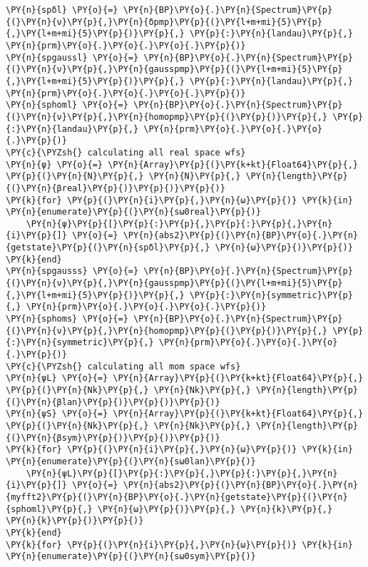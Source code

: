 \begin{Verbatim}[commandchars=\\\{\}]
\PY{n}{spδl} \PY{o}{=} \PY{n}{BP}\PY{o}{.}\PY{n}{Spectrum}\PY{p}{(}\PY{n}{ν}\PY{p}{,}\PY{n}{δpmp}\PY{p}{(}\PY{l+m+mi}{5}\PY{p}{,}\PY{l+m+mi}{5}\PY{p}{)}\PY{p}{,} \PY{p}{:}\PY{n}{landau}\PY{p}{,} \PY{n}{prm}\PY{o}{.}\PY{o}{.}\PY{o}{.}\PY{p}{)}
\PY{n}{spgaussl} \PY{o}{=} \PY{n}{BP}\PY{o}{.}\PY{n}{Spectrum}\PY{p}{(}\PY{n}{ν}\PY{p}{,}\PY{n}{gausspmp}\PY{p}{(}\PY{l+m+mi}{5}\PY{p}{,}\PY{l+m+mi}{5}\PY{p}{)}\PY{p}{,} \PY{p}{:}\PY{n}{landau}\PY{p}{,} \PY{n}{prm}\PY{o}{.}\PY{o}{.}\PY{o}{.}\PY{p}{)}
\PY{n}{sphoml} \PY{o}{=} \PY{n}{BP}\PY{o}{.}\PY{n}{Spectrum}\PY{p}{(}\PY{n}{ν}\PY{p}{,}\PY{n}{homopmp}\PY{p}{(}\PY{p}{)}\PY{p}{,} \PY{p}{:}\PY{n}{landau}\PY{p}{,} \PY{n}{prm}\PY{o}{.}\PY{o}{.}\PY{o}{.}\PY{p}{)}
\PY{c}{\PYZsh{} calculating all real space wfs}
\PY{n}{ψ} \PY{o}{=} \PY{n}{Array}\PY{p}{(}\PY{k+kt}{Float64}\PY{p}{,} \PY{p}{(}\PY{n}{N}\PY{p}{,} \PY{n}{N}\PY{p}{,} \PY{n}{length}\PY{p}{(}\PY{n}{βreal}\PY{p}{)}\PY{p}{)}\PY{p}{)}
\PY{k}{for} \PY{p}{(}\PY{n}{i}\PY{p}{,}\PY{n}{ω}\PY{p}{)} \PY{k}{in} \PY{n}{enumerate}\PY{p}{(}\PY{n}{sω0real}\PY{p}{)}
    \PY{n}{ψ}\PY{p}{[}\PY{p}{:}\PY{p}{,}\PY{p}{:}\PY{p}{,}\PY{n}{i}\PY{p}{]} \PY{o}{=} \PY{n}{abs2}\PY{p}{(}\PY{n}{BP}\PY{o}{.}\PY{n}{getstate}\PY{p}{(}\PY{n}{spδl}\PY{p}{,} \PY{n}{ω}\PY{p}{)}\PY{p}{)}
\PY{k}{end}
\PY{n}{spgausss} \PY{o}{=} \PY{n}{BP}\PY{o}{.}\PY{n}{Spectrum}\PY{p}{(}\PY{n}{ν}\PY{p}{,}\PY{n}{gausspmp}\PY{p}{(}\PY{l+m+mi}{5}\PY{p}{,}\PY{l+m+mi}{5}\PY{p}{)}\PY{p}{,} \PY{p}{:}\PY{n}{symmetric}\PY{p}{,} \PY{n}{prm}\PY{o}{.}\PY{o}{.}\PY{o}{.}\PY{p}{)}
\PY{n}{sphoms} \PY{o}{=} \PY{n}{BP}\PY{o}{.}\PY{n}{Spectrum}\PY{p}{(}\PY{n}{ν}\PY{p}{,}\PY{n}{homopmp}\PY{p}{(}\PY{p}{)}\PY{p}{,} \PY{p}{:}\PY{n}{symmetric}\PY{p}{,} \PY{n}{prm}\PY{o}{.}\PY{o}{.}\PY{o}{.}\PY{p}{)}
\PY{c}{\PYZsh{} calculating all mom space wfs}
\PY{n}{ψL} \PY{o}{=} \PY{n}{Array}\PY{p}{(}\PY{k+kt}{Float64}\PY{p}{,} \PY{p}{(}\PY{n}{Nk}\PY{p}{,} \PY{n}{Nk}\PY{p}{,} \PY{n}{length}\PY{p}{(}\PY{n}{βlan}\PY{p}{)}\PY{p}{)}\PY{p}{)}
\PY{n}{ψS} \PY{o}{=} \PY{n}{Array}\PY{p}{(}\PY{k+kt}{Float64}\PY{p}{,} \PY{p}{(}\PY{n}{Nk}\PY{p}{,} \PY{n}{Nk}\PY{p}{,} \PY{n}{length}\PY{p}{(}\PY{n}{βsym}\PY{p}{)}\PY{p}{)}\PY{p}{)}
\PY{k}{for} \PY{p}{(}\PY{n}{i}\PY{p}{,}\PY{n}{ω}\PY{p}{)} \PY{k}{in} \PY{n}{enumerate}\PY{p}{(}\PY{n}{sω0lan}\PY{p}{)}
    \PY{n}{ψL}\PY{p}{[}\PY{p}{:}\PY{p}{,}\PY{p}{:}\PY{p}{,}\PY{n}{i}\PY{p}{]} \PY{o}{=} \PY{n}{abs2}\PY{p}{(}\PY{n}{BP}\PY{o}{.}\PY{n}{myfft2}\PY{p}{(}\PY{n}{BP}\PY{o}{.}\PY{n}{getstate}\PY{p}{(}\PY{n}{sphoml}\PY{p}{,} \PY{n}{ω}\PY{p}{)}\PY{p}{,} \PY{n}{k}\PY{p}{,} \PY{n}{k}\PY{p}{)}\PY{p}{)}
\PY{k}{end}
\PY{k}{for} \PY{p}{(}\PY{n}{i}\PY{p}{,}\PY{n}{ω}\PY{p}{)} \PY{k}{in} \PY{n}{enumerate}\PY{p}{(}\PY{n}{sω0sym}\PY{p}{)}

\end{Verbatim}
